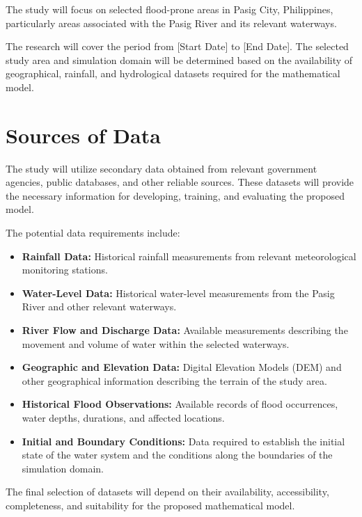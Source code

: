 The study will focus on selected flood-prone areas in Pasig City, Philippines, particularly areas associated with the Pasig River and its relevant waterways.

The research will cover the period from [Start Date] to [End Date]. The selected study area and simulation domain will be determined based on the availability of geographical, rainfall, and hydrological datasets required for the mathematical model.

\section{Sources of Data}

The study will utilize secondary data obtained from relevant government agencies, public databases, and other reliable sources. These datasets will provide the necessary information for developing, training, and evaluating the proposed model.

The potential data requirements include:

\begin{itemize}
    \item \textbf{Rainfall Data:} Historical rainfall measurements from relevant meteorological monitoring stations.
    
    \item \textbf{Water-Level Data:} Historical water-level measurements from the Pasig River and other relevant waterways.
    
    \item \textbf{River Flow and Discharge Data:} Available measurements describing the movement and volume of water within the selected waterways.
    
    \item \textbf{Geographic and Elevation Data:} Digital Elevation Models (DEM) and other geographical information describing the terrain of the study area.
    
    \item \textbf{Historical Flood Observations:} Available records of flood occurrences, water depths, durations, and affected locations.
    
    \item \textbf{Initial and Boundary Conditions:} Data required to establish the initial state of the water system and the conditions along the boundaries of the simulation domain.
\end{itemize}

The final selection of datasets will depend on their availability, accessibility, completeness, and suitability for the proposed mathematical model.


